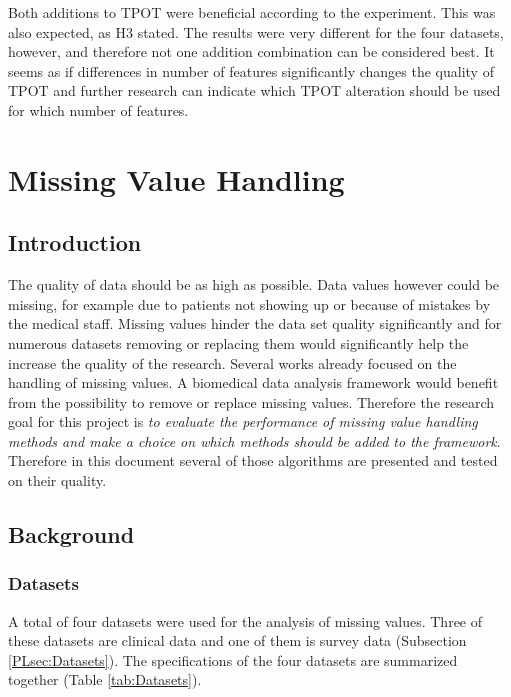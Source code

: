 \documentclass[10pt,a4paper]{report}
\begin{document}
	Both additions to TPOT were beneficial according to the experiment. This was also expected, as H3 stated. The results were very different for the four datasets, however, and therefore not one addition combination can be considered best. It seems as if differences in number of features significantly changes the quality of TPOT and further research can indicate which TPOT alteration should be used for which number of features.
	
	\chapter{Missing Value Handling}
	\label{chap:MissingValueHandling}
	
	\section{Introduction}
	\label{MVsec:Introduction}
	
	The quality of data should be as high as possible. Data values however could be missing, for example due to patients not showing up or because of mistakes by the medical staff. Missing values hinder the data set quality significantly and for numerous datasets removing or replacing them would significantly help the increase the quality of the research. Several works already focused on the handling of missing values\cite{donders2006gentle, cartwright2003dealing, haukoos2007advanced}. A biomedical data analysis framework would benefit from the possibility to remove or replace missing values. Therefore the research goal for this project is \emph{to evaluate the performance of missing value handling methods and make a choice on which methods should be added to the framework}. Therefore in this document several of those algorithms are presented and tested on their quality.
	
	\section{Background}
	\label{sec:Background}
	
	\subsection{Datasets}
	\label{MVsubsec:Datasets}
	
	A total of four datasets were used for the analysis of missing values. Three of these datasets are clinical data and one of them is survey data (Subsection \ref{PLsec:Datasets}). The specifications of the four datasets are summarized together (Table \ref{tab:Datasets}).
	
\end{document}
